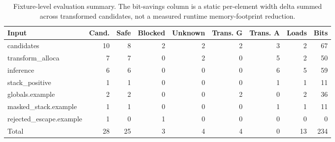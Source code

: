 \begin{table}[t]
\centering
\caption{Fixture-level evaluation summary. The bit-savings column is a static per-element width delta summed across transformed candidates, not a measured runtime memory-footprint reduction.}
\label{tab:fixture-results}
\begin{tabular}{lrrrrrrrr}
\hline
Input & Cand. & Safe & Blocked & Unknown & Trans. G & Trans. A & Loads & Bits \\
\hline
candidates & 10 & 8 & 2 & 2 & 2 & 3 & 2 & 67 \\
transform\_alloca & 7 & 7 & 0 & 2 & 0 & 5 & 2 & 50 \\
inference & 6 & 6 & 0 & 0 & 0 & 6 & 5 & 59 \\
stack\_positive & 1 & 1 & 0 & 0 & 0 & 1 & 1 & 11 \\
globals.example & 2 & 2 & 0 & 0 & 2 & 0 & 2 & 36 \\
masked\_stack.example & 1 & 1 & 0 & 0 & 0 & 1 & 1 & 11 \\
rejected\_escape.example & 1 & 0 & 1 & 0 & 0 & 0 & 0 & 0 \\
\hline
Total & 28 & 25 & 3 & 4 & 4 & 0 & 13 & 234 \\
\hline
\end{tabular}
\end{table}
